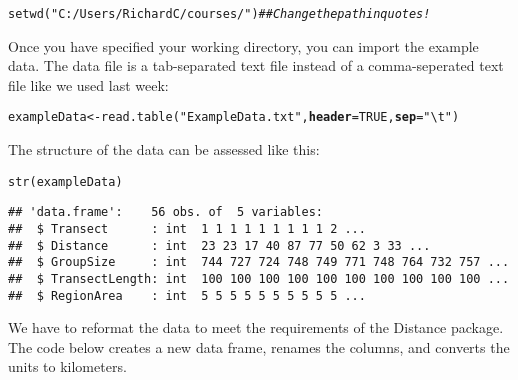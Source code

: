 \documentclass[12pt]{article}\usepackage[]{graphicx}\usepackage[]{xcolor}
\makeatletter
\newcommand{\hlnum}[1]{\textcolor[rgb]{0.69,0.494,0}{#1}}%
\newcommand{\hlstr}[1]{\textcolor[rgb]{0.749,0.012,0.012}{#1}}%
\newcommand{\hlcom}[1]{\textcolor[rgb]{0.514,0.506,0.514}{\textit{#1}}}%
\newcommand{\hlstd}[1]{\textcolor[rgb]{0,0,0}{#1}}%
\newcommand{\hlkwb}[1]{\textcolor[rgb]{0,0.341,0.682}{#1}}%
\newcommand{\hlkwc}[1]{\textcolor[rgb]{0,0,0}{\textbf{#1}}}%
\newcommand{\hlkwd}[1]{\textcolor[rgb]{0.004,0.004,0.506}{#1}}%
\newenvironment{kframe}{%
 \def\at@end@of@kframe{}%
 \ifinner\ifhmode%
  \def\at@end@of@kframe{\end{minipage}}%
  \begin{minipage}{\columnwidth}%
 \fi\fi%
 \def\FrameCommand##1{\hskip\@totalleftmargin \hskip-\fboxsep
 \colorbox{shadecolor}{##1}\hskip-\fboxsep
     \hskip-\linewidth \hskip-\@totalleftmargin \hskip\columnwidth}%
 \MakeFramed {\advance\hsize-\width
   \@totalleftmargin\z@ \linewidth\hsize
   \@setminipage}}%
 {\par\unskip\endMakeFramed%
 \at@end@of@kframe}
\newenvironment{knitrout}{}{} %
\makeatother
\begin{document}
\begin{knitrout}
\color{fgcolor}\begin{kframe}
\begin{alltt}
\hlkwd{setwd}\hlstd{(}\hlstr{"C:/Users/RichardC/courses/"}\hlstd{)} \hlcom{## Change the path in quotes!}
\end{alltt}
\end{kframe}
\end{knitrout}

Once you have specified your working directory, you can import
the example data. The data file is a tab-separated text file
instead of a comma-seperated text file like we used last week:

\begin{knitrout}
\color{fgcolor}\begin{kframe}
\begin{alltt}
\hlstd{exampleData} \hlkwb{<-} \hlkwd{read.table}\hlstd{(}\hlstr{"ExampleData.txt"}\hlstd{,} \hlkwc{header}\hlstd{=}\hlnum{TRUE}\hlstd{,} \hlkwc{sep}\hlstd{=}\hlstr{"\textbackslash{}t"}\hlstd{)}
\end{alltt}
\end{kframe}
\end{knitrout}



The structure of the data can be assessed like this:

\begin{knitrout}
\color{fgcolor}\begin{kframe}
\begin{alltt}
\hlkwd{str}\hlstd{(exampleData)}
\end{alltt}
\begin{verbatim}
## 'data.frame':	56 obs. of  5 variables:
##  $ Transect      : int  1 1 1 1 1 1 1 1 1 2 ...
##  $ Distance      : int  23 23 17 40 87 77 50 62 3 33 ...
##  $ GroupSize     : int  744 727 724 748 749 771 748 764 732 757 ...
##  $ TransectLength: int  100 100 100 100 100 100 100 100 100 100 ...
##  $ RegionArea    : int  5 5 5 5 5 5 5 5 5 5 ...
\end{verbatim}
\end{kframe}
\end{knitrout}

\clearpage

We have to reformat the data to meet the requirements of the Distance
package. The code below creates a new data frame, renames the columns,
and converts the units to kilometers.
\end{document}
